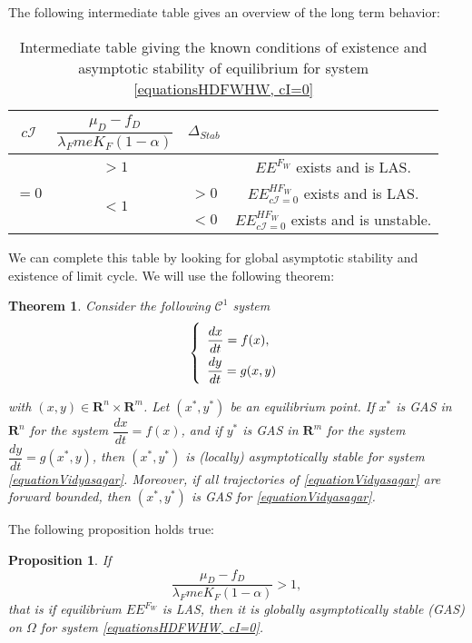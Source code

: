\documentclass{article}
\newcommand{\lfw}{\lambda_{F}}
\newcommand{\lfw}{\lambda_{F}}
\newcommand{\cI}{c \mathcal{I}}
\newtheorem{theorem}{Theorem}
\newtheorem{prop}{Proposition}
\begin{document}
The following intermediate table gives an overview of the long term behavior:

\begin{table}[!ht]
\centering
\def\arraystretch{2}
\begin{tabular}{c|c|c|c}
$\cI$ & $\dfrac{\mu_D - f_D}{\lfw m e K_F(1-\alpha)}$ &  $\Delta_{Stab}$ & \\
\hline
\multirow{3}{*}{$=0$} & $ > 1$ & &$EE^{F_W}$ exists and is LAS.  \\
\cline{2-4}
 & \multirow{2}{*}{$< 1$} & $>0$ &$EE^{HF_W}_{\cI=0}$ exists and is LAS.\\
 \cline{3-4}
 & & $ < 0$ &$EE^{HF_W}_{\cI=0}$ exists and is unstable.
\end{tabular}
\caption{\centering Intermediate table giving the known conditions of existence and asymptotic stability of equilibrium for system \eqref{equationsHDFWHW, cI=0}}
\end{table}

We can complete this table by looking for global asymptotic stability and existence of limit cycle. We will use the following theorem:

\begin{theorem}\label{theoremVidyasagar} \cite{vidyasagar_decomposition_1980, dumont_mathematical_2012}
Consider the following $\mathcal{C}^1$ system
\begin{equation}
\def\arraystretch{2}
\left\{ \begin{array}{l}
\dfrac{dx}{dt} = f(x), \\
\dfrac{dy}{dt} = g(x, y) 
\end{array} \right.
\label{equationVidyasagar}
\end{equation}

with $(x, y) \in \mathbf{R}^n \times\mathbf{R}^m$. Let $(x^*, y^*)$ be an equilibrium point.
If $x^*$ is GAS in $\mathbf{R}^n$ for the system $\dfrac{dx}{dt} = f(x)$, and if $y^*$ is GAS in $\mathbf{R}^m$ for the system $\dfrac{dy}{dt} = g(x^*, y)$, then $(x^*, y^*)$ is (locally) asymptotically stable for system \eqref{equationVidyasagar}. Moreover, if all trajectories of \eqref{equationVidyasagar} are forward bounded, then $(x^*, y^*)$ is GAS for \eqref{equationVidyasagar}.
\end{theorem}

The following proposition holds true:

\begin{prop}\label{propEEFGAS}If 
$$
\dfrac{\mu_D - f_D}{\lfw m e K_F(1-\alpha)} >1,
$$
that is if equilibrium $EE^{F_W}$ is LAS, then it is globally asymptotically stable (GAS) on $\Omega$ for system \eqref{equationsHDFWHW, cI=0}.
\end{prop}
\end{document}
